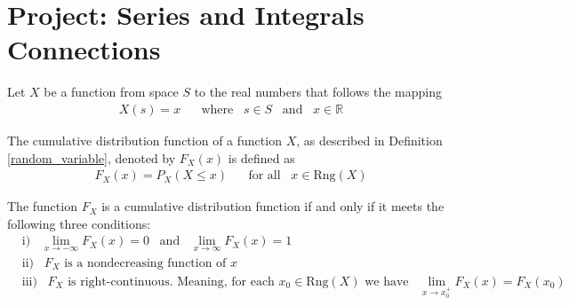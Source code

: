 \section{Project: Series and Integrals Connections}

\begin{definition}
Let $X$ be a function from space $S$ to the real numbers that follows the mapping
\begin{align*}
    X(s) = x \hspace{20pt} \text{where} \hspace{10pt} s \in S \hspace{10pt} \text{and} \hspace{10pt} x \in \mathbb{R}
\end{align*}
\label{random_variable}
\end{definition}

\begin{definition}
The cumulative distribution function of a function $X$, as described in Definition \ref{random_variable}, denoted by $F_{X}(x)$ is defined as
\begin{align*}
    F_{X}(x) = P_{X}(X \leq x) \hspace{20pt} \text{for all} \hspace{10pt} x \in \text{Rng}(X)
\end{align*}
\label{cumulative_distribution_function}
\end{definition}

\begin{theorem}
The function $F_{X}$ is a cumulative distribution function if and only if it meets the following three conditions:
\begin{align*}
    &\text{i)} \hspace{10pt} \lim_{x \longrightarrow -\infty} F_{X}(x) = 0 \hspace{10pt} \text{and} \hspace{10pt} \lim_{x \longrightarrow \infty} F_{X}(x) = 1\\[2ex]
    &\text{ii)} \hspace{10pt} F_{X} \hspace{4pt} \text{is a nondecreasing function of} \hspace{4pt} x\\[2ex]
    &\text{iii)} \hspace{10pt} F_{X} \hspace{4pt} \text{is right-continuous. Meaning, for each} \hspace{4pt} x_{0} \in \text{Rng}(X) \hspace{4pt} \text{we have} \hspace{10pt} \lim_{x \longrightarrow x_{0}^{+}} F_{X}(x) = F_{X}(x_{0})
\end{align*}
\end{theorem}

